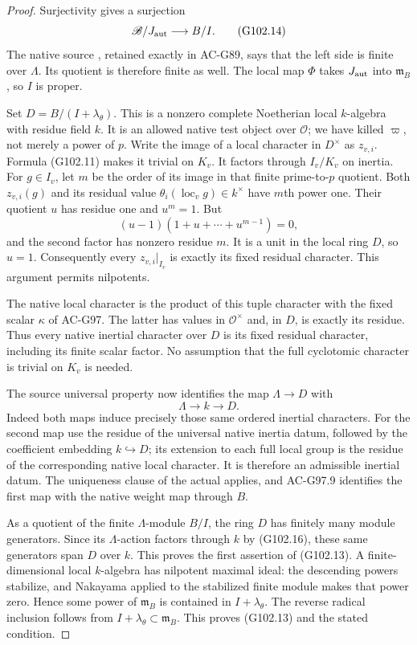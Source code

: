 \begin{proof}
Surjectivity gives a surjection
\[
             \mathscr B/J_{\rm aut}\longrightarrow B/I.
\tag{G102.14}
\]
The native source , retained exactly
in AC-G89, says that the left side is finite over $\Lambda$.
Its quotient is therefore finite as well.
The local map $\Phi$ takes $J_{\rm aut}$ into
$\mathfrak m_B$, so $I$ is proper.

Set $D=B/(I+\lambda_\theta)$.  This is a nonzero complete
Noetherian local $k$-algebra with residue field $k$.
It is an allowed native test object over $\mathcal O$;
we have killed $\varpi$, not merely a power of $p$.
Write the image of a local character in $D^\times$ as
$z_{v,i}$.  Formula (G102.11) makes it trivial on $K_v$.
It factors through $I_v/K_v$ on inertia.
For $g\in I_v$, let $m$ be the order of its image in that
finite prime-to-$p$ quotient.  Both $z_{v,i}(g)$ and its
residual value $\theta_i(\operatorname{loc}_v g)\in k^\times$
have $m$th power one.  Their quotient $u$ has residue one and
$u^m=1$.  But
\[
 (u-1)(1+u+\cdots+u^{m-1})=0,
\tag{G102.15}
\]
and the second factor has nonzero residue $m$.
It is a unit in the local ring $D$, so $u=1$.
Consequently every $z_{v,i}|_{I_v}$ is exactly its fixed
residual character.  This argument permits nilpotents.

The native local character is the product of this tuple
character with the fixed scalar $\kappa$ of AC-G97.
The latter has values in $\mathcal O^\times$ and, in $D$,
is exactly its residue.  Thus every native inertial character
over $D$ is its fixed residual character, including its
finite scalar factor.  No assumption that the full
cyclotomic character is trivial on $K_v$ is needed.

The source universal property  now
identifies the map $\Lambda\to D$ with
\[
                           \Lambda\longrightarrow k
                                      \longrightarrow D.
\tag{G102.16}
\]
Indeed both maps induce precisely those same ordered
inertial characters.  For the second map use the residue
of the universal native inertia datum, followed by the
coefficient embedding $k\hookrightarrow D$; its extension
to each full local group is the residue of the corresponding
native local character.  It is therefore an admissible
inertial datum.  The uniqueness clause of the actual
 applies, and AC-G97.9 identifies the first map
with the native weight map through $B$.

As a quotient of the finite $\Lambda$-module $B/I$, the
ring $D$ has finitely many module generators.  Since its
$\Lambda$-action factors through $k$ by (G102.16), these
same generators span $D$ over $k$.
This proves the first assertion of (G102.13).
A finite-dimensional local $k$-algebra has nilpotent
maximal ideal: the descending powers stabilize, and
Nakayama applied to the stabilized finite module makes
that power zero.  Hence some power of $\mathfrak m_B$
is contained in $I+\lambda_\theta$.
The reverse radical inclusion follows from
$I+\lambda_\theta\subset\mathfrak m_B$.
This proves (G102.13) and the stated  condition.
\end{proof}

